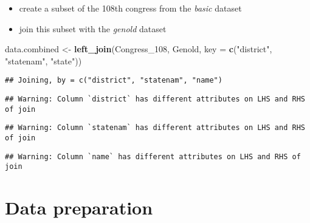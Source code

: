 \documentclass[
]{article}
\newenvironment{Shaded}{\begin{snugshade}}{\end{snugshade}}
\newcommand{\DataTypeTok}[1]{\textcolor[rgb]{0.13,0.29,0.53}{#1}}
\newcommand{\DecValTok}[1]{\textcolor[rgb]{0.00,0.00,0.81}{#1}}
\newcommand{\KeywordTok}[1]{\textcolor[rgb]{0.13,0.29,0.53}{\textbf{#1}}}
\newcommand{\NormalTok}[1]{#1}
\newcommand{\OperatorTok}[1]{\textcolor[rgb]{0.81,0.36,0.00}{\textbf{#1}}}
\newcommand{\StringTok}[1]{\textcolor[rgb]{0.31,0.60,0.02}{#1}}
\providecommand{\tightlist}{%
  \setlength{\itemsep}{0pt}\setlength{\parskip}{0pt}}
\begin{document}
\begin{itemize}
\tightlist
\item
  create a subset of the 108th congress from the \emph{basic} dataset
\end{itemize}

\begin{Shaded}
\end{Shaded}

\begin{itemize}
\tightlist
\item
  join this subset with the \emph{genold} dataset
\end{itemize}

\begin{Shaded}
\begin{Highlighting}[]
\NormalTok{data.combined <-}\StringTok{ }\KeywordTok{left_join}\NormalTok{(Congress_}\DecValTok{108}\NormalTok{, Genold, }\DataTypeTok{key =} \KeywordTok{c}\NormalTok{(}\StringTok{"district"}\NormalTok{, }\StringTok{"statenam"}\NormalTok{, }\StringTok{"state"}\NormalTok{))}
\end{Highlighting}
\end{Shaded}

\begin{verbatim}
## Joining, by = c("district", "statenam", "name")
\end{verbatim}

\begin{verbatim}
## Warning: Column `district` has different attributes on LHS and RHS of join
\end{verbatim}

\begin{verbatim}
## Warning: Column `statenam` has different attributes on LHS and RHS of join
\end{verbatim}

\begin{verbatim}
## Warning: Column `name` has different attributes on LHS and RHS of join
\end{verbatim}

\hypertarget{data-preparation}{%
\section{Data preparation}\label{data-preparation}}
\end{document}
